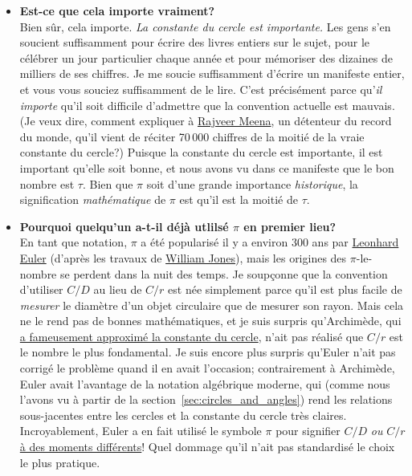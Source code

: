 \begin{itemize}
  \item \textbf{Est-ce que cela importe vraiment\ns?} \\ Bien sûr, cela importe.
  \emph{La constante du cercle est importante.} Les gens s'en soucient
  suffisamment pour écrire des livres entiers sur le sujet, pour le célébrer un
  jour particulier chaque année et pour mémoriser des dizaines de milliers de
  ses chiffres. Je me soucie suffisamment d'écrire un manifeste entier, et vous
  vous souciez suffisamment de le lire. C'est précisément parce qu'\emph{il
  importe} qu'il soit difficile d'admettre que la convention actuelle est
  mauvais. (Je veux dire, comment expliquer à
  \href{https://www.guinnessworldrecords.com/world-records/most-pi-places-memorised}{Rajveer
  Meena}, un détenteur du record du monde, qu'il vient de réciter 70\,000
  chiffres de la moitié de la vraie constante du cercle\ns?) Puisque la constante
  du cercle est importante, il est important qu'elle soit bonne, et nous avons
  vu dans ce manifeste que le bon nombre est $\tau$. Bien que $\pi$ soit d'une
  grande importance \emph{historique}, la signification \emph{mathématique} de
  $\pi$ est qu'il est la moitié de $\tau$.

  \item \textbf{Pourquoi quelqu'un a-t-il déjà utlilsé $\pi$ en premier lieu\ns?}
  \\ En tant que notation, $\pi$ a été popularisé il y a environ 300 ans par
  \href{https://fr.wikipedia.org/wiki/Leonhard_Euler}{Leonhard Euler} (d'après
  les travaux de
  \href{https://fr.wikipedia.org/wiki/William_Jones_(mathématicien)}{William
  Jones}), mais les origines des $\pi$-le-nombre se perdent dans la nuit des
  temps. Je soupçonne que la convention d'utiliser $C/D$ au lieu de $C/r$ est
  née simplement parce qu'il est plus facile de \emph{mesurer} le diamètre d'un
  objet circulaire que de mesurer son rayon. Mais cela ne le rend pas de bonnes
  mathématiques, et je suis surpris qu'Archimède, qui \href{http://itech.fgcu.edu/faculty/clindsey/mhf4404/archimedes/archimedes.html}{a
  fameusement approximé la constante du cercle}, n'ait pas réalisé que $C/r$ est
  le nombre le plus fondamental. Je suis encore plus surpris qu'Euler n'ait pas
  corrigé le problème quand il en avait l'occasion\ns; contrairement à Archimède,
  Euler avait l'avantage de la notation algébrique moderne, qui (comme nous
  l'avons vu à partir de la section~\ref{sec:circles_and_angles}) rend les
  relations sous-jacentes entre les cercles et la constante du cercle très
  claires. Incroyablement, Euler a en fait utilisé le symbole $\pi$ pour
  signifier $C/D$ \emph{ou} $C/r$ \href{https://bit.ly/2OERR3G}{à des moments
  différents}\ns! Quel dommage qu'il n'ait pas standardisé le choix le plus
  pratique.


\end{itemize}
